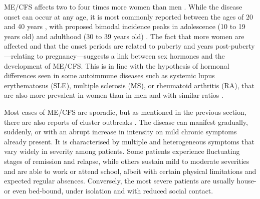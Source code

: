 ME/CFS affects two to four times more women than men \citep{castro-marrero2017ComorbidityChronic, lim2020ReviewCase}.
While the disease onset can occur at any age, it is most commonly reported between the ages of 20 and 40 years \citep{valdez2018EstimatingPrevalence}, with proposed bimodal incidence peaks in adolescence (10 to 19 years old) and adulthood (30 to 39 years old) \citep{bakken2014TwoAge}.
The fact that more women are affected and that the onset periods are related to puberty and years post-puberty---relating to pregnancy---suggests a link between sex hormones and the development of ME/CFS.
This is in line with the hypothesis of hormonal differences seen in some autoimmune diseases such as systemic lupus erythematosus (SLE), multiple sclerosis (MS), or rheumatoid arthritis (RA), that are also more prevalent in women than in men and with similar ratios \citep{whitacre2001SexDifferences, quintero2012AutoimmuneDisease}.

Most cases of ME/CFS are sporadic, but as mentioned in the previous section, there are also reports of cluster outbreaks \citep{themedicalstaffoftheroyalfreehospital1957OutbreakEncephalomyelitis}.
The disease can manifest gradually, suddenly, or with an abrupt increase in intensity on mild chronic symptoms already present. It is characterised by multiple and heterogeneous symptoms that vary widely in severity among patients. Some patients experience fluctuating stages of remission and relapse, while others sustain mild to moderate severities and are able to work or attend school, albeit with certain physical limitations and expected regular absences. Conversely, the most severe patients are usually house- or even bed-bound, under isolation and with reduced social contact.

